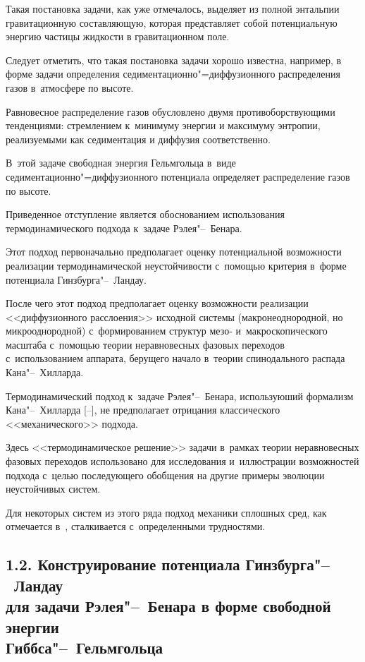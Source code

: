 Такая постановка задачи, как уже отмечалось, выделяет из полной энтальпии гравитационную составляющую, которая представляет собой потенциальную энергию частицы жидкости в гравитационном поле. 

Следует отметить, что такая постановка задачи хорошо известна, например, в форме задачи определения седиментационно"=диффузионного распределения газов в~атмосфере по высоте. 

Равновесное распределение газов обусловлено двумя противоборствующими тенденциями:  стремлением к~минимуму энергии и максимуму энтропии, реализуемыми как седиментация и диффузия соответственно. 

В~этой задаче свободная энергия Гельмгольца в~виде седиментационно"=диффузионного потенциала определяет распределение газов по высоте.



Приведенное отступление является обоснованием использования термодинамического подхода к~задаче Рэлея"--~Бенара.

Этот подход первоначально предполагает оценку потенциальной возможности реализации термодинамической неустойчивости с~помощью критерия в~форме потенциала Гинзбурга"--~Ландау. 

После чего этот подход предполагает оценку возможности реализации <<диффузионного расслоения>> исходной системы (макронеоднородной, но микрооднородной) с~формированием структур мезо- и~макроскопического масштаба с~помощью теории неравновесных фазовых переходов с~использованием аппарата, берущего начало в~теории спинодального распада Кана"--~Хилларда.



Термодинамический подход к~задаче Рэлея"--~Бенара, используюший формализм Кана"--~Хилларда  [--], не предполагает отрицания классического <<механического>> подхода.

Здесь <<термодинамическое решение>> задачи в~рамках теории неравновесных фазовых переходов использовано для исследования и~иллюстрации возможностей подхода с~целью последующего обобщения на другие примеры эволюции неустойчивых систем. 

Для некоторых систем  из этого ряда подход механики сплошных сред, как отмечается в~\cite{lukashev:bib46}, сталкивается с~определенными трудностями.



\subsection*{\normalsize 1.2. Конструирование потенциала Гинзбурга"--~Ландау \\ \phantom{1.2.} для задачи Рэлея"--~Бенара в форме свободной энергии \\ \phantom{1.2.} Гиббса"--~Гельмгольца}





